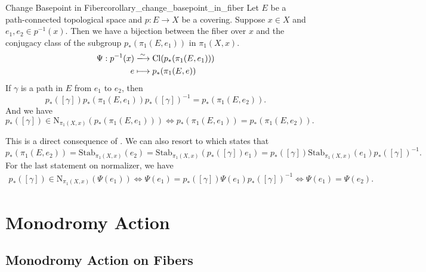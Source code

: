 \documentclass{report}
\begin{document}
\begin{corollary}{Change Basepoint in Fiber}{corollary_change_basepoint_in_fiber}
	Let $E$ be a path-connected topological space and $p:E\to X$ be a covering. Suppose $x\in X$ and $e_1,e_2\in p^{-1}(x)$. Then we have a bijection between the fiber over $x$ and the conjugacy class of the subgroup $p_*(\pi_1(E,e_1))$ in $\pi_1(X,x)$.
	\begin{align*}
		\Psi:p^{-1}(x) & \xlongrightarrow{\sim} \mathrm{Cl}(p_*(\pi_1(E,e_1))) \\
		e              & \longmapsto p_*(\pi_1(E,e))
	\end{align*}
	If $\gamma$ is a path in $E$ from $e_1$ to $e_2$, then
	$$
		p_*([\gamma])p_*(\pi_1(E,e_1))p_*([\gamma])^{-1}=p_*(\pi_1(E,e_2)).
	$$
	And we have
	$$
		p_*([\gamma])\in\mathrm{N}_{\pi_1(X,x)}(p_*(\pi_1(E,e_1)))\iff p_*(\pi_1(E,e_1))=p_*(\pi_1(E,e_2)).
	$$
\end{corollary}
\begin{prf}
	This is a direct consequence of . We can also resort to  which states that
	\[
		p_*(\pi_1(E,e_2))=\mathrm{Stab}_{\pi_1(X,x)}(e_2)=\mathrm{Stab}_{\pi_1(X,x)}\left(p_*([\gamma])e_1\right)=p_*([\gamma])\mathrm{Stab}_{\pi_1(X,x)}(e_1)p_*([\gamma])^{-1}.
	\]
	For the last statement on normalizer, we have
	\begin{align*}
		p_*([\gamma])\in\mathrm{N}_{\pi_1(X,x)}(\Psi(e_1))\iff \Psi(e_1)=p_*([\gamma])\Psi(e_1)p_*([\gamma])^{-1} \iff \Psi(e_1)=\Psi(e_2).
	\end{align*}
	
\end{prf}




\section{Monodromy Action}

\subsection{Monodromy Action on Fibers}
\end{document}
